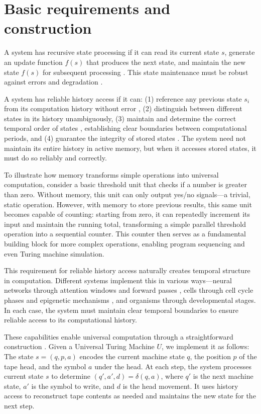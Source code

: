 \documentclass[12pt]{article}
\begin{document}
\section{Basic requirements and construction}

A system has recursive state processing if it can read its current state $s$, generate an update function $f(s)$ that produces the next state, and maintain the new state $f(s)$ for subsequent processing \cite{manuri2019state}.
This state maintenance must be robust against errors and degradation \cite{yang2013survey}.

A system has reliable history access if it can: (1) reference any previous state $s_i$ from its computation history without error \cite{fu2024memory}, (2) distinguish between different states in its history unambiguously, (3) maintain and determine the correct temporal order of states \cite{berridge2014cell,pastor2020computation}, establishing clear boundaries between computational periods, and (4) guarantee the integrity of stored states \cite{lovkvist2021using}.
The system need not maintain its entire history in active memory, but when it accesses stored states, it must do so reliably and correctly.

To illustrate how memory transforms simple operations into universal computation, consider a basic threshold unit that checks if a number is greater than zero.
Without memory, this unit can only output yes/no signals---a trivial, static operation.
However, with memory to store previous results, this same unit becomes capable of counting: starting from zero, it can repeatedly increment its input and maintain the running total, transforming a simple parallel threshold operation into a sequential counter.
This counter then serves as a fundamental building block for more complex operations, enabling program sequencing and even Turing machine simulation.

This requirement for reliable history access naturally creates temporal structure in computation.
Different systems implement this in various ways---neural networks through attention windows and forward passes \cite{martini2015information,quentin2019differential}, cells through cell cycle phases and epigenetic mechanisms \cite{bruno2022epigenetic}, and organisms through developmental stages.
In each case, the system must maintain clear temporal boundaries to ensure reliable access to its computational history.

These capabilities enable universal computation through a straightforward construction \cite{deutsch1995universality,bennett1989time}.
Given a Universal Turing Machine $U$, we implement it as follows: The state $s = (q, p, a)$ encodes the current machine state $q$, the position $p$ of the tape head, and the symbol $a$ under the head.
At each step, the system processes current state $s$ to determine $(q', a', d) = \delta(q, a)$, where $q'$ is the next machine state, $a'$ is the symbol to write, and $d$ is the head movement.
It uses history access to reconstruct tape contents as needed and maintains the new state for the next step.
\end{document}

